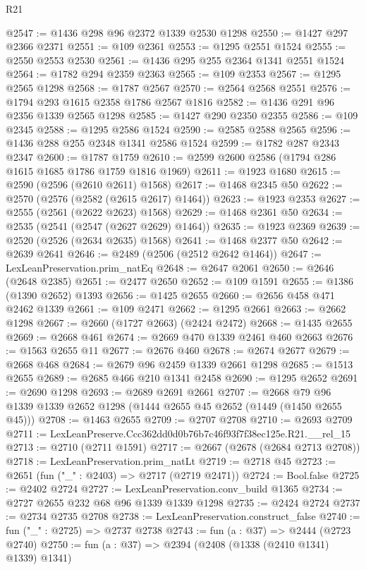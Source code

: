 \begin{lexlean}{R21}
\begin{coremodule}
@2547 := @1436 @298 @96 @2372 @1339 @2530 @1298
@2550 := @1427 @297 @2366 @2371
@2551 := @109 @2361
@2553 := @1295 @2551 @1524
@2555 := @2550 @2553 @2530
@2561 := @1436 @295 @255 @2364 @1341 @2551 @1524
@2564 := @1782 @294 @2359 @2363
@2565 := @109 @2353
@2567 := @1295 @2565 @1298
@2568 := @1787 @2567
@2570 := @2564 @2568 @2551
@2576 := @1794 @293 @1615 @2358 @1786 @2567 @1816
@2582 := @1436 @291 @96 @2356 @1339 @2565 @1298
@2585 := @1427 @290 @2350 @2355
@2586 := @109 @2345
@2588 := @1295 @2586 @1524
@2590 := @2585 @2588 @2565
@2596 := @1436 @288 @255 @2348 @1341 @2586 @1524
@2599 := @1782 @287 @2343 @2347
@2600 := @1787 @1759
@2610 := @2599 @2600 @2586 (@1794 @286 @1615 @1685 @1786 @1759 @1816 @1969)
@2611 := @1923 @1680
@2615 := @2590 (@2596 (@2610 @2611) @1568)
@2617 := @1468 @2345 @50
@2622 := @2570 (@2576 (@2582 (@2615 @2617) @1464))
@2623 := @1923 @2353
@2627 := @2555 (@2561 (@2622 @2623) @1568)
@2629 := @1468 @2361 @50
@2634 := @2535 (@2541 (@2547 (@2627 @2629) @1464))
@2635 := @1923 @2369
@2639 := @2520 (@2526 (@2634 @2635) @1568)
@2641 := @1468 @2377 @50
@2642 := @2639 @2641
@2646 := @2489 (@2506 (@2512 @2642 @1464))
@2647 := LexLeanPreservation.prim_natEq
@2648 := @2647 @2061
@2650 := @2646 (@2648 @2385)
@2651 := @2477 @2650
@2652 := @109 @1591
@2655 := @1386 (@1390 @2652) @1393
@2656 := @1425 @2655
@2660 := @2656 @458 @471 @2462 @1339
@2661 := @109 @2471
@2662 := @1295 @2661
@2663 := @2662 @1298
@2667 := @2660 (@1727 @2663) (@2424 @2472)
@2668 := @1435 @2655
@2669 := @2668 @461
@2674 := @2669 @470 @1339 @2461 @460 @2663
@2676 := @1563 @2655 @11
@2677 := @2676 @460
@2678 := @2674 @2677
@2679 := @2668 @468
@2684 := @2679 @96 @2459 @1339 @2661 @1298
@2685 := @1513 @2655
@2689 := @2685 @466 @210 @1341 @2458
@2690 := @1295 @2652
@2691 := @2690 @1298
@2693 := @2689 @2691 @2661
@2707 := @2668 @79 @96 @1339 @1339 @2652 @1298 (@1444 @2655 @45 @2652 (@1449 (@1450 @2655 @45)))
@2708 := @1463 @2655
@2709 := @2707 @2708
@2710 := @2693 @2709
@2711 := LexLeanPreserve.Ccc362dd0d0b76b7c46f93f7f38ec125e.R21.__rel_15
@2713 := @2710 (@2711 @1591)
@2717 := @2667 (@2678 (@2684 @2713 @2708))
@2718 := LexLeanPreservation.prim_natLt
@2719 := @2718 @45
@2723 := @2651 (fun ("_" : @2403) => @2717 (@2719 @2471))
@2724 := Bool.false
@2725 := @2402 @2724
@2727 := LexLeanPreservation.conv_build @1365
@2734 := @2727 @2655 @232 @68 @96 @1339 @1339 @1298
@2735 := @2424 @2724
@2737 := @2734 @2735 @2708
@2738 := LexLeanPreservation.construct_false
@2740 := fun ("_" : @2725) => @2737 @2738
@2743 := fun (a : @37) => @2444 (@2723 @2740)
@2750 := fun (a : @37) => @2394 (@2408 (@1338 (@2410 @1341) @1339) @1341)

\end{coremodule}
\end{lexlean}

